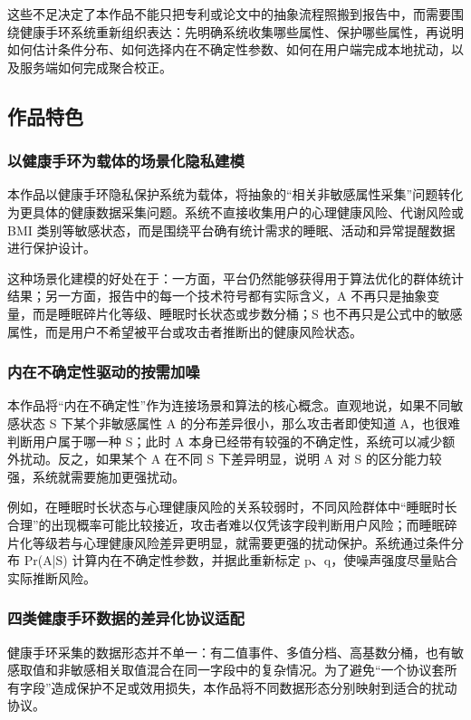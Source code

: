 \documentclass{cumcmthesis}
\numberwithin{equation}{section}
\numberwithin{figure}{section}
\numberwithin{table}{section}
\begin{document}
这些不足决定了本作品不能只把专利或论文中的抽象流程照搬到报告中，而需要围绕健康手环系统重新组织表达：先明确系统收集哪些属性、保护哪些属性，再说明如何估计条件分布、如何选择内在不确定性参数、如何在用户端完成本地扰动，以及服务端如何完成聚合校正。

\subsection{作品特色}

\subsubsection{以健康手环为载体的场景化隐私建模}

本作品以健康手环隐私保护系统为载体，将抽象的“相关非敏感属性采集”问题转化为更具体的健康数据采集问题。系统不直接收集用户的心理健康风险、代谢风险或 BMI 类别等敏感状态，而是围绕平台确有统计需求的睡眠、活动和异常提醒数据进行保护设计。

这种场景化建模的好处在于：一方面，平台仍然能够获得用于算法优化的群体统计结果；另一方面，报告中的每一个技术符号都有实际含义，A 不再只是抽象变量，而是睡眠碎片化等级、睡眠时长状态或步数分桶；S 也不再只是公式中的敏感属性，而是用户不希望被平台或攻击者推断出的健康风险状态。

\subsubsection{内在不确定性驱动的按需加噪}

本作品将“内在不确定性”作为连接场景和算法的核心概念。直观地说，如果不同敏感状态 S 下某个非敏感属性 A 的分布差异很小，那么攻击者即使知道 A，也很难判断用户属于哪一种 S；此时 A 本身已经带有较强的不确定性，系统可以减少额外扰动。反之，如果某个 A 在不同 S 下差异明显，说明 A 对 S 的区分能力较强，系统就需要施加更强扰动。

例如，在睡眠时长状态与心理健康风险的关系较弱时，不同风险群体中“睡眠时长合理”的出现概率可能比较接近，攻击者难以仅凭该字段判断用户风险；而睡眠碎片化等级若与心理健康风险差异更明显，就需要更强的扰动保护。系统通过条件分布 Pr(A|S) 计算内在不确定性参数，并据此重新标定 p、q，使噪声强度尽量贴合实际推断风险。

\subsubsection{四类健康手环数据的差异化协议适配}

健康手环采集的数据形态并不单一：有二值事件、多值分档、高基数分桶，也有敏感取值和非敏感相关取值混合在同一字段中的复杂情况。为了避免“一个协议套所有字段”造成保护不足或效用损失，本作品将不同数据形态分别映射到适合的扰动协议。
\end{document}

